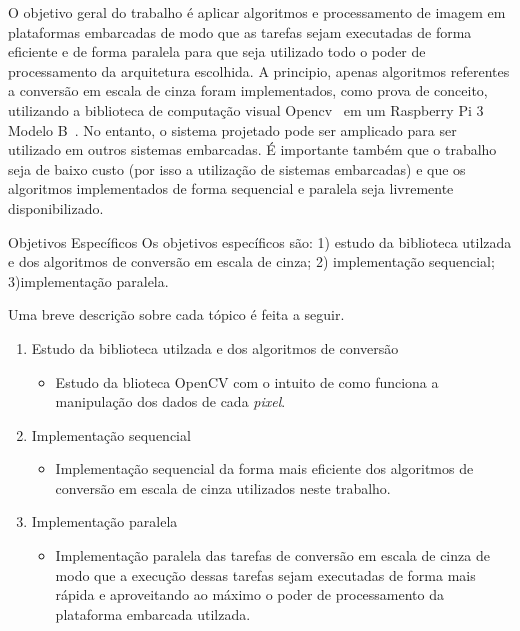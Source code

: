 O objetivo geral do trabalho é aplicar algoritmos e processamento de imagem em
plataformas embarcadas de modo que as tarefas sejam executadas de forma
eficiente e de forma paralela para que seja utilizado todo o poder de
processamento da arquitetura escolhida. A principio, apenas algoritmos
referentes a conversão em escala de cinza foram implementados, como prova de
conceito, utilizando a biblioteca de computação visual Opencv~\cite{opencv} em
um Raspberry Pi 3 Modelo B~\cite{raspberry}. No entanto, o sistema projetado
pode ser amplicado para ser utilizado em outros sistemas embarcadas. É
importante também que o trabalho seja de baixo custo (por isso a utilização de
sistemas embarcadas) e que os algoritmos implementados de forma sequencial e
paralela seja livremente disponibilizado.

\begin{subsection}{Objetivos Específicos}
Os objetivos específicos são: 1) estudo da biblioteca utilzada e dos algoritmos de conversão
em escala de cinza; 2) implementação sequencial; 3)implementação paralela.

Uma breve descrição sobre cada tópico é feita a seguir.

\begin{enumerate}

\item Estudo da biblioteca utilzada e dos algoritmos de conversão
\begin{itemize}
\item Estudo da blioteca OpenCV com o intuito de como funciona a manipulação dos
dados de cada \textit{pixel}.
\end{itemize}

\item Implementação sequencial 

\begin{itemize}
\item Implementação sequencial da forma mais eficiente dos algoritmos de
conversão em escala de cinza utilizados neste trabalho.
\end{itemize} 
\item Implementação paralela


\begin{itemize} 

\item Implementação paralela das tarefas de conversão em escala de cinza de modo
que a execução dessas tarefas sejam executadas de forma mais rápida e
aproveitando ao máximo o poder de processamento da plataforma embarcada
utilzada.
\end{itemize} 
\end{enumerate}

\end{subsection}



